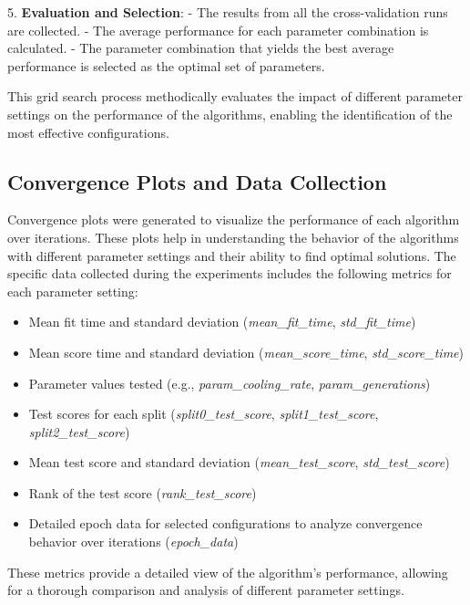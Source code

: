 \documentclass{article}
\begin{document}
    5. \textbf{Evaluation and Selection}:
    - The results from all the cross-validation runs are collected.
    - The average performance for each parameter combination is calculated.
    - The parameter combination that yields the best average performance is selected as the optimal set of parameters.

    This grid search process methodically evaluates the impact of different parameter settings on the performance of the algorithms, enabling the identification of the most effective configurations.

    \subsection{Convergence Plots and Data Collection}

    Convergence plots were generated to visualize the performance of each algorithm over iterations. These plots help in understanding the behavior of the algorithms with different parameter settings and their ability to find optimal solutions. The specific data collected during the experiments includes the following metrics for each parameter setting:

    \begin{itemize}
        \item Mean fit time and standard deviation (\textit{mean\_fit\_time}, \textit{std\_fit\_time})
        \item Mean score time and standard deviation (\textit{mean\_score\_time}, \textit{std\_score\_time})
        \item Parameter values tested (e.g., \textit{param\_cooling\_rate}, \textit{param\_generations})
        \item Test scores for each split (\textit{split0\_test\_score}, \textit{split1\_test\_score}, \textit{split2\_test\_score})
        \item Mean test score and standard deviation (\textit{mean\_test\_score}, \textit{std\_test\_score})
        \item Rank of the test score (\textit{rank\_test\_score})
        \item Detailed epoch data for selected configurations to analyze convergence behavior over iterations (\textit{epoch\_data})
    \end{itemize}

    These metrics provide a detailed view of the algorithm's performance, allowing for a thorough comparison and analysis of different parameter settings.
\end{document}
